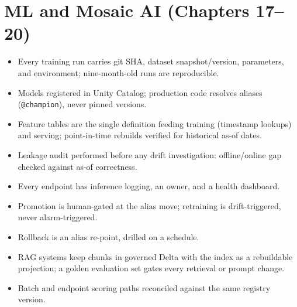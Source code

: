 \section{ML and Mosaic AI (Chapters 17--20)}
%
\begin{itemize}
    \item[$\square$] Every training run carries git SHA, dataset snapshot/version, parameters,
    and environment; nine-month-old runs are reproducible.
    \item[$\square$] Models registered in Unity Catalog; production code resolves aliases
    (\texttt{@champion}), never pinned versions.
    \item[$\square$] Feature tables are the single definition feeding training (timestamp
    lookups) and serving; point-in-time rebuilds verified for historical as-of dates.
    \item[$\square$] Leakage audit performed before any drift investigation: offline/online gap
    checked against as-of correctness.
    \item[$\square$] Every endpoint has inference logging, an owner, and a health dashboard.
    \item[$\square$] Promotion is human-gated at the alias move; retraining is drift-triggered,
    never alarm-triggered.
    \item[$\square$] Rollback is an alias re-point, drilled on a schedule.
    \item[$\square$] RAG systems keep chunks in governed Delta with the index as a rebuildable
    projection; a golden evaluation set gates every retrieval or prompt change.
    \item[$\square$] Batch and endpoint scoring paths reconciled against the same registry
    version.
\end{itemize}

